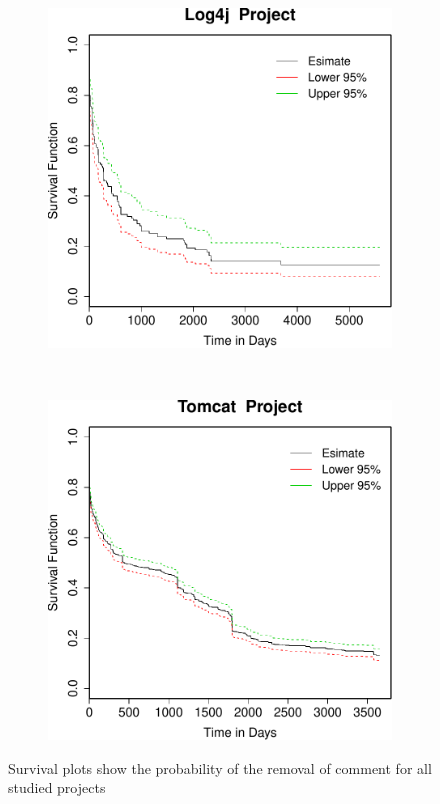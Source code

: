 \begin{figure}[t]
	
	\begin{subfigure}[b]{0.31\textwidth}
		\includegraphics[width=\textwidth]{figures/Survival/log4j.pdf}
	\end{subfigure}
	~
	~
	\begin{subfigure}[b]{0.31\textwidth}
		\includegraphics[width=\textwidth]{figures/Survival/tomcat.pdf}
	\end{subfigure}
	\caption{Survival plots show the probability of the removal of \SATD comment for all studied projects}
	\label{fig:survival_plots}
\end{figure}

